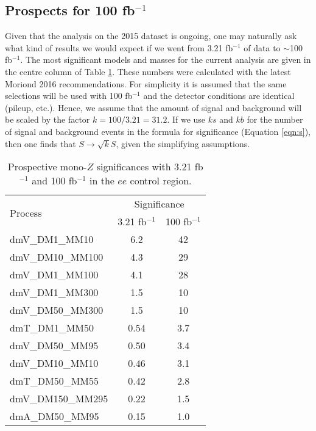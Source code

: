 \subsection{Prospects for 100 fb$^{-1}$}
\label{sec:prospects}

Given that the analysis on the 2015 dataset is ongoing, one may naturally ask what kind of results we would expect if we went from 3.21 fb$^{-1}$ of data to $\sim$100 fb$^{-1}$. The most significant models and masses for the current analysis are given in the centre column of Table \ref{tbl:run2sig}. These numbers were calculated with the latest Moriond 2016 recommendations. For simplicity it is assumed that the same selections will be used with 100 fb$^{-1}$ and the detector conditions are identical (pileup, etc.). Hence, we assume that the amount of signal and background will be scaled by the factor $k = 100/3.21= 31.2$. If we use $ks$ and $kb$ for the number of signal and background events in the formula for significance (Equation \ref{eqn:s}), then one finds that $S \rightarrow \sqrt{k}S$, given the simplifying assumptions.

\begin{table}[ht]
\centering
\begin{tabular}{|l||c|c|}
\hline
\multirow{2}{*}{Process} & \multicolumn{2}{c|}{Significance}                      \\ \cline{2-3}
            				& 3.21 fb$^{-1}$      & 100 fb$^{-1}$ 	   \\ \hline \hline
dmV\_DM1\_MM10     	& 6.2                       & 42                    \\ \hline
dmV\_DM10\_MM100   	& 4.3                       & 29                    \\ \hline
dmV\_DM1\_MM100    	& 4.1                       & 28                    \\ \hline
dmV\_DM1\_MM300    	& 1.5                       & 10                    \\ \hline
dmV\_DM50\_MM300	& 1.5                       & 10                    \\ \hline
dmT\_DM1\_MM50   	& 0.54                       & 3.7                      \\ \hline
dmV\_DM50\_MM95    	& 0.50                       & 3.4                     \\ \hline
dmV\_DM10\_MM10    	& 0.46                       & 3.1                     \\ \hline
dmT\_DM50\_MM55    	& 0.42                       & 2.8                     \\ \hline
dmV\_DM150\_MM295  	& 0.22                       & 1.5                      \\ \hline
dmA\_DM50\_MM95    	& 0.15                       & 1.0                      \\ \hline
\end{tabular}
\caption[Prospective mono-$Z$ significances with 3.21 fb$^{-1}$ and 100 fb$^{-1}$ in the $ee$ control region]{Prospective mono-$Z$ significances with 3.21 fb$^{-1}$ and 100 fb$^{-1}$ in the $ee$ control region.}
\label{tbl:run2sig}
\end{table}

